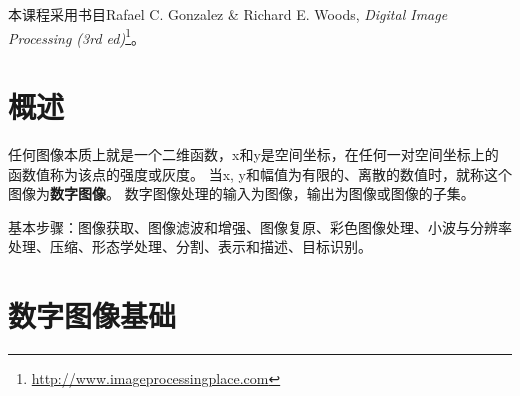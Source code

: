 
本课程采用书目Rafael C. Gonzalez \& Richard E. Woods, \emph{Digital Image Processing (3rd ed)}\footnote{\url{http://www.imageprocessingplace.com}}。

\section{概述}
任何图像本质上就是一个二维函数，x和y是空间坐标，在任何一对空间坐标上的函数值称为该点的强度或灰度。
当x, y和幅值为有限的、离散的数值时，就称这个图像为\textbf{数字图像}。
数字图像处理的输入为图像，输出为图像或图像的子集。

基本步骤：图像获取、图像滤波和增强、图像复原、彩色图像处理、小波与分辨率处理、压缩、形态学处理、分割、表示和描述、目标识别。

\section{数字图像基础}
